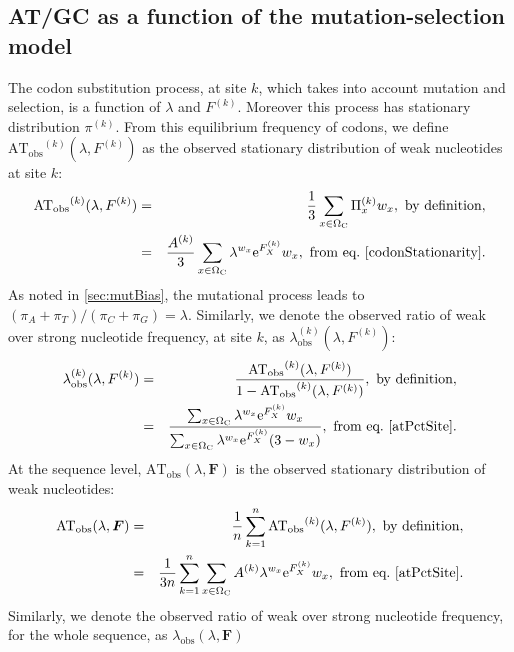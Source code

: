 \documentclass{article}
\newcommand{\e}{\mathrm{e}}
\newcommand{\SetCodon}{\Omega_{\mathrm{C}}}
\begin{document}
    \subsection{AT/GC as a function of the mutation-selection model}
    The codon substitution process, at site $k$, which takes into account mutation and selection, is a function of $\lambda$ and $F^{(k)}$. Moreover this process has stationary distribution $\pi^{(k)}$. From this equilibrium frequency of codons, we define $\mathrm{AT_{obs}}^{(k)}(\lambda, F^{(k)})$ as the observed stationary distribution of weak nucleotides at site $k$:
    \begin{eqnarray}
	    \mathrm{AT_{obs}}^{(k)}(\lambda, F^{(k)})
	    & = & \frac{1}{3} \sum_{x \in \SetCodon} \Pi_x^{(k)} w_x , \ \textrm{by definition},\\
	    & = & \frac{A^{(k)}}{3} \sum_{x \in \SetCodon} \lambda^{w_x} \e^{F_X^{(k)}} w_x , \ \textrm{from eq.} \ \ref{codonStationarity}.
	    \label{atPctSite}
    \end{eqnarray}
    As noted in \ref{sec:mutBias}, the mutational process leads to $(\pi_A+\pi_T)/(\pi_C+\pi_G) = \lambda$. Similarly, we denote the observed ratio of weak over strong nucleotide frequency, at site $k$, as $\lambda_{\mathrm{obs}}^{(k)} (\lambda, F^{(k)})$:
    \begin{eqnarray}
	    \lambda_{\mathrm{obs}}^{(k)} (\lambda, F^{(k)})
	    & = & \dfrac{\mathrm{AT_{obs}}^{(k)}(\lambda, F^{(k)})}{1 - \mathrm{AT_{obs}}^{(k)}(\lambda, F^{(k)}) }, \ \textrm{by definition},\\
	    & = & \dfrac{ \sum_{x \in \SetCodon} \lambda^{w_x} \e^{F_X^{(k)}} w_x}{\sum_{x \in \SetCodon} \lambda^{w_x} \e^{F_X^{(k)}} (3 - w_x )}, \ \textrm{from eq.} \ \ref{atPctSite}.
    \end{eqnarray}
    At the sequence level, $\mathrm{AT_{obs}}(\lambda, \bm{F})$ is the observed stationary distribution of weak nucleotides:
    \begin{eqnarray}
	    \mathrm{AT_{obs}}(\lambda, \bm{F})
	    & = & \frac{1}{n}\sum_{k=1}^{n} \mathrm{AT_{obs}}^{(k)}(\lambda, F^{(k)}), \ \textrm{by definition}, \\
	    & = & \frac{1}{3n}\sum_{k=1}^{n} \sum_{x \in \SetCodon} A^{(k)} \lambda^{w_x} \e^{F_X^{(k)}} w_x , \ \textrm{from eq.} \ \ref{atPctSite}.
	    \label{atPctSeq}
    \end{eqnarray}
    Similarly, we denote the observed ratio of weak over strong nucleotide frequency, for the whole sequence, as $\lambda_{\mathrm{obs}} (\lambda, \bm{F})$
\end{document}
